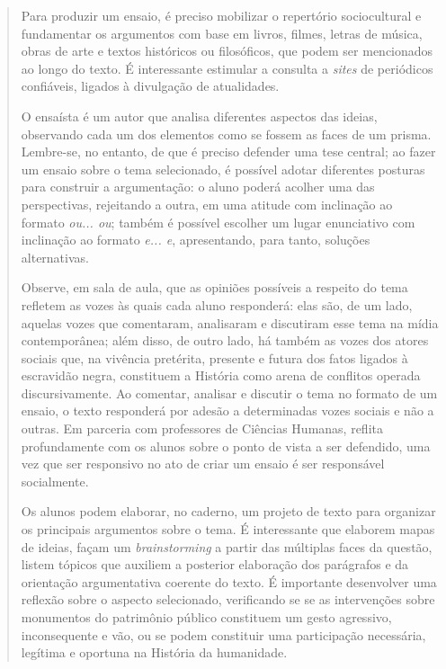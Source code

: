\documentclass[11pt]{extarticle}
\begin{document}
\begin{quote}
Para produzir um ensaio, é preciso mobilizar o repertório sociocultural
e fundamentar os argumentos com base em livros, filmes, letras de
música, obras de arte e textos históricos ou filosóficos, que podem ser
mencionados ao longo do texto. É interessante estimular a consulta a
\emph{sites} de periódicos confiáveis, ligados à divulgação de
atualidades.

O ensaísta é um autor que analisa diferentes aspectos das ideias,
observando cada um dos elementos como se fossem as faces de um prisma.
Lembre-se, no entanto, de que é preciso defender uma tese central; ao
fazer um ensaio sobre o tema selecionado, é possível adotar diferentes
posturas para construir a argumentação: o aluno poderá acolher uma das
perspectivas, rejeitando a outra, em uma atitude com inclinação ao
formato \emph{ou... ou}; também é possível escolher um lugar enunciativo
com inclinação ao formato \emph{e... e}, apresentando, para tanto,
soluções alternativas.

Observe, em sala de aula, que as opiniões possíveis a respeito do tema
refletem as vozes às quais cada aluno responderá: elas são, de um lado,
aquelas vozes que comentaram, analisaram e discutiram esse tema na mídia
contemporânea; além disso, de outro lado, há também as vozes dos atores
sociais que, na vivência pretérita, presente e futura dos fatos ligados
à escravidão negra, constituem a História como arena de conflitos
operada discursivamente. Ao comentar, analisar e discutir o tema no
formato de um ensaio, o texto responderá por adesão a determinadas vozes
sociais e não a outras. Em parceria com professores de Ciências Humanas,
reflita profundamente com os alunos sobre o ponto de vista a ser
defendido, uma vez que ser responsivo no ato de criar um ensaio é ser
responsável socialmente.

Os alunos podem elaborar, no caderno, um projeto de texto para organizar
os principais argumentos sobre o tema. É interessante que elaborem mapas
de ideias, façam um \emph{brainstorming} a partir das múltiplas faces da
questão, listem tópicos que auxiliem a posterior elaboração dos
parágrafos e da orientação argumentativa coerente do texto. É importante
desenvolver uma reflexão sobre o aspecto selecionado, verificando se se
as intervenções sobre monumentos do patrimônio público constituem um
gesto agressivo, inconsequente e vão, ou se podem constituir uma
participação necessária, legítima e oportuna na História da humanidade.


\end{quote}
\end{document}
